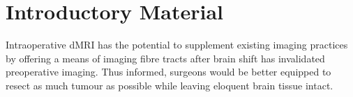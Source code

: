 \chapter{Introductory Material}
\label{chapterlabel0}

Intraoperative dMRI has the potential to supplement existing imaging practices by offering a means of imaging fibre tracts after brain shift has invalidated preoperative imaging.\autocite{Nimsky2001}
Thus informed, surgeons would be better equipped to resect as much tumour as possible while leaving eloquent brain tissue intact.
